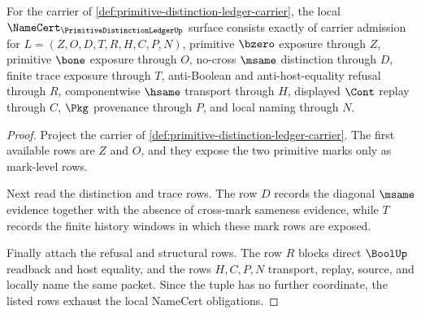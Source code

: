 \begin{theorem}
\label{thm:primitive-distinction-ledger-namecert-obligations}
For the carrier of \autoref{def:primitive-distinction-ledger-carrier}, the local $\NameCert_{\PrimitiveDistinctionLedgerUp}$ surface consists exactly of carrier admission for $L=(Z,O,D,T,R,H,C,P,N)$, primitive $\bzero$ exposure through $Z$, primitive $\bone$ exposure through $O$, no-cross $\msame$ distinction through $D$, finite trace exposure through $T$, anti-Boolean and anti-host-equality refusal through $R$, componentwise $\hsame$ transport through $H$, displayed $\Cont$ replay through $C$, $\Pkg$ provenance through $P$, and local naming through $N$.
\end{theorem}
\begin{proof}
Project the carrier of \autoref{def:primitive-distinction-ledger-carrier}. The first available rows are $Z$ and $O$, and they expose the two primitive marks only as mark-level rows.

Next read the distinction and trace rows. The row $D$ records the diagonal $\msame$ evidence together with the absence of cross-mark sameness evidence, while $T$ records the finite history windows in which these mark rows are exposed.

Finally attach the refusal and structural rows. The row $R$ blocks direct $\BoolUp$ readback and host equality, and the rows $H,C,P,N$ transport, replay, source, and locally name the same packet. Since the tuple has no further coordinate, the listed rows exhaust the local NameCert obligations.
\end{proof}

